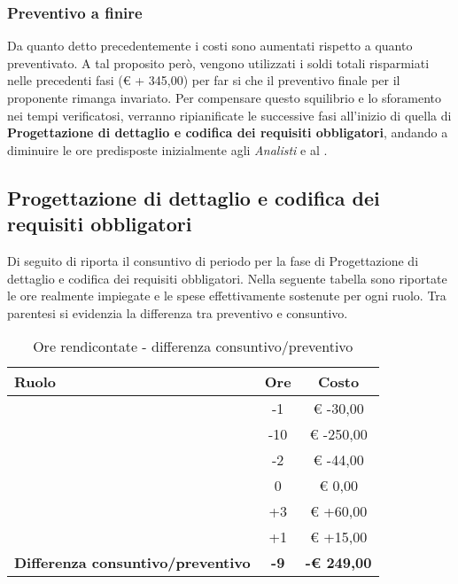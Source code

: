 
		\subsubsection{Preventivo a finire} %
		Da quanto detto precedentemente i costi sono aumentati rispetto a quanto preventivato. A tal proposito però, vengono utilizzati i soldi totali risparmiati nelle precedenti fasi (\euro{} + 345,00) per far si che il preventivo finale per il proponente rimanga invariato. \newline
		Per compensare questo squilibrio e lo sforamento nei tempi verificatosi, verranno ripianificate le successive fasi all'inizio di quella di \textbf{Progettazione di dettaglio e codifica dei requisiti obbligatori}, andando a diminuire le ore predisposte inizialmente agli \emph{Analisti} e al \roleProjectManager.



	\subsection{Progettazione di dettaglio e codifica dei requisiti obbligatori} %
	\label{sub:consuntivo_progettazione_di_dettaglio_e_codifica_dei_requisiti_obbligatori}
		Di seguito di riporta il consuntivo di periodo per la fase di Progettazione di dettaglio e codifica dei requisiti obbligatori. \newline
		Nella seguente tabella sono riportate le ore realmente impiegate e le spese effettivamente sostenute per ogni ruolo. Tra parentesi si evidenzia la differenza tra preventivo e consuntivo.
		\begin{table}[!h]
			\begin{center}
				\begin{tabularx}{0.90\textwidth}{|X|c|c|}
					\hline
					\textbf{Ruolo} & \textbf{Ore} & \textbf{Costo} \\
					\hline
					\roleProjectManager & -1 & \euro{} -30,00 \\
					\hline
					\roleAnalyst & -10 &  \euro{} -250,00 \\
					\hline
					\roleDesigner & -2 & \euro{} -44,00 \\
					\hline
					\roleAdministrator & 0  & \euro{} 0,00 \\
					\hline
					\roleProgrammer & +3 & \euro{} +60,00 \\
					\hline
					\roleVerifier & +1 & \euro{} +15,00 \\
					\hline
					\textbf{Differenza consuntivo/preventivo} & \textbf{-9} & \textbf{-\euro{} 249,00} \\
					\hline
				\end{tabularx}
			\end{center}
		\caption{Ore rendicontate - differenza consuntivo/preventivo}
		\end{table}

